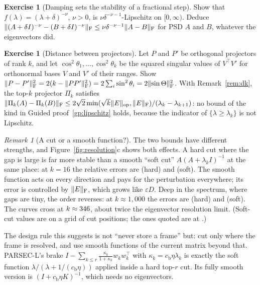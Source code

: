 \documentclass[11pt,a4paper]{article}
\DeclarePairedDelimiter{\norm}{\lVert}{\rVert}
\newcommand{\op}{\mathrm{op}}
\newcommand{\F}{\mathrm{F}}
\theoremstyle{plain}
\theoremstyle{definition}
\newtheorem{exercise}[proposition]{Exercise}
\theoremstyle{remark}
\newtheorem{remark}[proposition]{Remark}
\begin{document}
\begin{exercise}[Damping sets the stability of a fractional step]\label{ex:fractional}
Show that $f(\lambda)=(\lambda+\delta)^{-\nu}$, $\nu>0$, is $\nu\delta^{-\nu-1}$-Lipschitz on $[0,\infty)$. Deduce
$\norm{(A+\delta I)^{-\nu}-(B+\delta I)^{-\nu}}_\F\le\nu\delta^{-\nu-1}\norm{A-B}_\F$ for PSD $A$ and $B$, whatever
the eigenvectors did.
\end{exercise}

\begin{exercise}[Distance between projectors]\label{ex:projector}
Let $P$ and $P'$ be orthogonal projectors of rank $k$, and let $\cos^2\theta_1,\dots,\cos^2\theta_k$ be the squared
singular values of $V^\top V'$ for orthonormal bases $V$ and $V'$ of their ranges. Show
$\norm{P-P'}_\F^2=2(k-\norm{PP'}_\F^2)=2\sum_i\sin^2\theta_i=2\norm{\sin\Theta}_\F^2$. With Remark~\ref{rem:dk}, the
top-$k$ projector $\Pi_k$ satisfies
$\norm{\Pi_k(A)-\Pi_k(B)}_\F\le2\sqrt2\min(\sqrt k\norm{E}_\op,\norm{E}_\F)/(\lambda_k-\lambda_{k+1})$: no bound of
the kind in Guided proof~\ref{gp:lipschitz} holds, because the indicator of $\{\lambda\ge\lambda_k\}$ is not Lipschitz.
\end{exercise}

\begin{remark}[A cut or a smooth function?]\label{rem:cut}
The two bounds have different strengths, and Figure~\ref{fig:resolution}c shows both effects. A hard cut where the
gap is large is far more stable than a smooth ``soft cut'' $A(A+\lambda_kI)^{-1}$ at the same place: at $k=16$ the
relative errors are \NumHardSixteen{} (hard) and \NumSoftSixteen{} (soft). The smooth function acts on every direction
and pays for the perturbation everywhere; its error is controlled by $\norm{E}_\F$, which grows like $\varepsilon D$.
Deep in the spectrum, where gaps are tiny, the order reverses: at $k\approx1{,}000$ the errors are \NumHardThousand{}
(hard) and \NumSoftThousand{} (soft). The curves cross at $k\approx346$, about twice the eigenvector
resolution limit. (Soft-cut values are on a grid of cut positions; the ones quoted are at \NumSoftCuts.)

The design rule this suggests is not ``never store a frame'' but: cut only where the frame is resolved, and use
smooth functions of the current matrix beyond that. PARSEC-L's brake $I-\sum_{k\le r}\frac{\kappa_k}{1+\kappa_k}w_kw_k^\top$
with $\kappa_k=c_{\mathrm b}\eta\lambda_k$ is exactly the soft function $\lambda/(\lambda+1/(c_{\mathrm b}\eta))$
applied inside a hard top-$r$ cut. Its fully smooth version is $(I+c_{\mathrm b}\eta K)^{-1}$, which needs no
eigenvectors.
\end{remark}
\end{document}

